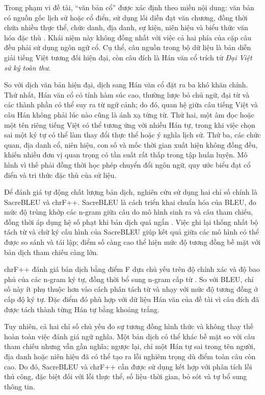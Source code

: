 Trong phạm vi đề tài, ``văn bản cổ'' được xác định theo miền nội dung: văn bản có nguồn gốc lịch sử hoặc cổ điển, sử dụng lối diễn đạt văn chương, đồng thời chứa nhiều thực thể, chức danh, địa danh, sự kiện, niên hiệu và biểu thức văn hóa đặc thù \cite{projectspec2026}. Khái niệm này không đồng nhất với việc cả hai phía của cặp câu đều phải sử dụng ngôn ngữ cổ. Cụ thể, câu nguồn trong bộ dữ liệu là bản diễn giải tiếng Việt tương đối hiện đại, còn câu đích là Hán văn cổ trích từ \textit{Đại Việt sử ký toàn thư}.

So với dịch văn bản hiện đại, dịch sang Hán văn cổ đặt ra ba khó khăn chính. Thứ nhất, Hán văn cổ có tính hàm súc cao, thường lược bỏ chủ ngữ, đại từ và các thành phần có thể suy ra từ ngữ cảnh; do đó, quan hệ giữa câu tiếng Việt và câu Hán không phải lúc nào cũng là ánh xạ từng từ. Thứ hai, một âm đọc hoặc một tên riêng tiếng Việt có thể tương ứng với nhiều Hán tự, trong khi việc chọn sai một ký tự có thể làm thay đổi thực thể hoặc ý nghĩa lịch sử. Thứ ba, các chức quan, địa danh cổ, niên hiệu, con số và mốc thời gian xuất hiện không đồng đều, khiến nhiều đơn vị quan trọng có tần suất rất thấp trong tập huấn luyện. Mô hình vì thế phải đồng thời học phép chuyển đổi ngôn ngữ, quy ước biểu đạt cổ điển và tri thức đặc thù của sử liệu.

Để đánh giá tự động chất lượng bản dịch, nghiên cứu sử dụng hai chỉ số chính là SacreBLEU và chrF++. SacreBLEU là cách triển khai chuẩn hóa của BLEU, đo mức độ trùng khớp các n-gram giữa câu do mô hình sinh ra và câu tham chiếu, đồng thời áp dụng hệ số phạt khi bản dịch quá ngắn \cite{papineni2002bleu,post2018sacrebleu}. Việc ghi lại thống nhất bộ tách từ và chữ ký cấu hình của SacreBLEU giúp kết quả giữa các mô hình có thể được so sánh và tái lập; điểm số càng cao thể hiện mức độ tương đồng bề mặt với bản dịch tham chiếu càng lớn.

chrF++ đánh giá bản dịch bằng điểm F dựa chủ yếu trên độ chính xác và độ bao phủ của các n-gram ký tự, đồng thời bổ sung n-gram cấp từ \cite{popovic2015chrf,popovic2017chrfpp}. So với BLEU, chỉ số này ít phụ thuộc hơn vào cách phân tách từ và nhạy với mức độ tương đồng ở cấp độ ký tự. Đặc điểm đó phù hợp với dữ liệu Hán văn của đề tài vì câu đích đã được tách thành từng Hán tự bằng khoảng trắng.

Tuy nhiên, cả hai chỉ số chủ yếu đo sự tương đồng hình thức và không thay thế hoàn toàn việc đánh giá ngữ nghĩa. Một bản dịch có thể khác bề mặt so với câu tham chiếu nhưng vẫn gần nghĩa; ngược lại, chỉ một Hán tự sai trong tên người, địa danh hoặc niên hiệu đã có thể tạo ra lỗi nghiêm trọng dù điểm toàn câu còn cao. Do đó, SacreBLEU và chrF++ cần được sử dụng kết hợp với phân tích lỗi thủ công, đặc biệt đối với lỗi thực thể, số liệu--thời gian, bỏ sót và tự bổ sung thông tin.

